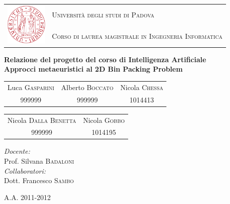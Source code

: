 \thispagestyle{empty}
\begin{center}
	\leavevmode
	\large
	\begin{tabular}{ r l }
		\multirow{2}{*}{\includegraphics[width=2cm]{img/unipd_logo.png}} & \textsc{Università degli studi di Padova}\par \\
			& \textsc{Corso di laurea magistrale in Ingegneria Informatica} \\
	\end{tabular}
	\vskip 3cm
	
	\vfill
	\textbf{{\large Relazione del progetto del corso di Intelligenza Artificiale}}\\[0.2cm]
	\textbf{{\LARGE Approcci metaeuristici al 2D Bin Packing Problem}}\par
	\vskip 3cm
	\normalfont
	
	\begin{tabular}{ c c c }
		\large Luca \textsc{Gasparini} & Alberto \textsc{Boccato} &
				Nicola \textsc{Chessa} \\
		\normalsize 999999 & 999999 & 1014413 \\
	\end{tabular}
	\vskip 0.5cm
	\begin{tabular}{ c c }
		\large Nicola \textsc{Dalla Benetta} & Nicola \textsc{Gobbo} \\
		\normalsize 999999 & 1014195 \\
	\end{tabular}
	\normalfont
	\vskip 4cm
	
	\begin{flushright}
		\emph{Docente:}\\
		Prof. Silvana \textsc{Badaloni}\\
	 \vskip 2cm
		\emph{Collaboratori:}\\
		Dott. Francesco \textsc{Sambo}\\
	\end{flushright}

	
	\vfill
	{\large A.A. 2011-2012}
\end{center}
\cleardoublepage
